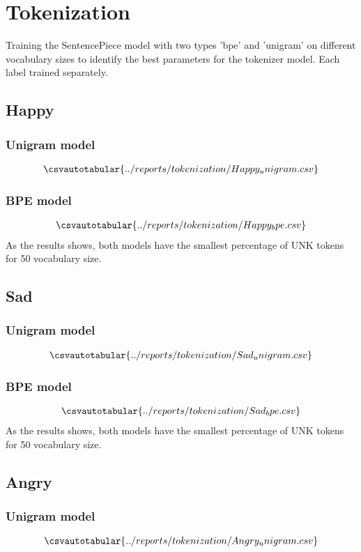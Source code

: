 \documentclass[a4paper]{article}
\begin{document}
\section{Tokenization}
Training the SentencePiece model with two types 'bpe' and 'unigram' on different vocabulary sizes to identify the best parameters for the tokenizer model. Each label trained separately.
\subsection{Happy}
\subsubsection{Unigram model}
\begin{align*}
	\csvautotabular{../reports/tokenization/Happy_unigram.csv}
\end{align*} 
\subsubsection{BPE model}
\begin{align*}
	\csvautotabular{../reports/tokenization/Happy_bpe.csv}
\end{align*} 
As the results shows, both models have the smallest percentage of UNK tokens for 50 vocabulary size.
\subsection{Sad}
\subsubsection{Unigram model}
\begin{align*}
	\csvautotabular{../reports/tokenization/Sad_unigram.csv}
\end{align*} 
\subsubsection{BPE model}
\begin{align*}
	\csvautotabular{../reports/tokenization/Sad_bpe.csv}
\end{align*} 
As the results shows, both models have the smallest percentage of UNK tokens for 50 vocabulary size.

\subsection{Angry}
\subsubsection{Unigram model}
\begin{align*}
	\csvautotabular{../reports/tokenization/Angry_unigram.csv}
\end{align*} 
\end{document}
